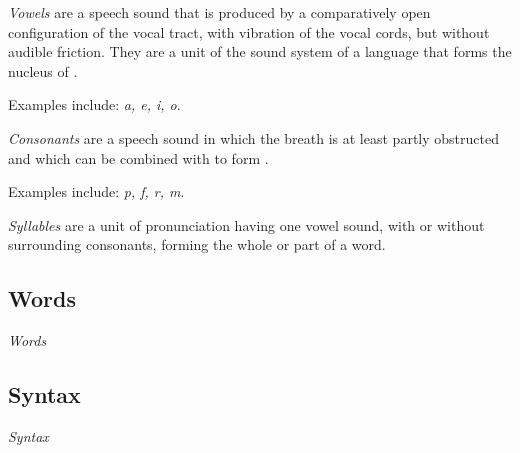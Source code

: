 \begin{definition}[Vowels] \label{def:Vowels}
  \emph{Vowels} are a speech sound that is produced by a comparatively open configuration of the vocal tract, with vibration of the vocal cords, but without audible friction.
  They are a unit of the sound system of a language that forms the nucleus of .
  
  Examples include: \emph{a, e, i, o}.
\end{definition}

\begin{definition}[Consonants] \label{def:Consonants}
  \emph{Consonants} are a speech sound in which the breath is at least partly obstructed and which can be combined with  to form .
  
  Examples include: \emph{p, f, r, m}.
\end{definition}

\begin{definition}[Syllables] \label{def:Syllables}
  \emph{Syllables} are a unit of pronunciation having one vowel sound, with or without surrounding consonants, forming the whole or part of a word.
\end{definition}

\subsection{Words} \label{subsec:Words}
\begin{definition}[Words] \label{def:Words}
  \emph{Words}
\end{definition}

\subsection{Syntax} \label{subsec:Syntax}
\begin{definition}[Syntax] \label{def:Syntax}
  \emph{Syntax}
\end{definition}